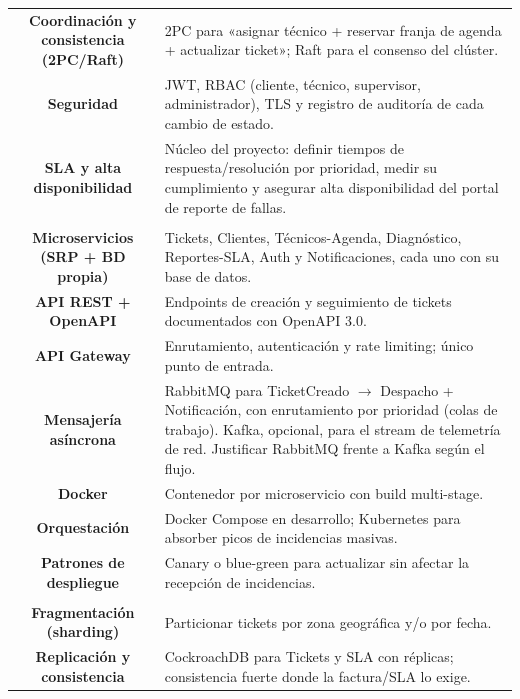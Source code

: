 \documentclass[11pt]{article}
\begin{document}
\begin{longtable}{C A}
\textbf{Coordinación y consistencia (2PC/Raft)} & 2PC para «asignar técnico + reservar franja de agenda + actualizar ticket»; Raft para el consenso del clúster.\\
\textbf{Seguridad} & JWT, RBAC (cliente, técnico, supervisor, administrador), TLS y registro de auditoría de cada cambio de estado.\\
\textbf{SLA y alta disponibilidad} & Núcleo del proyecto: definir tiempos de respuesta/resolución por prioridad, medir su cumplimiento y asegurar alta disponibilidad del portal de reporte de fallas.\\
\addlinespace[1pt]
\\
\textbf{Microservicios (SRP + BD propia)} & Tickets, Clientes, Técnicos-Agenda, Diagnóstico, Reportes-SLA, Auth y Notificaciones, cada uno con su base de datos.\\
\textbf{API REST + OpenAPI} & Endpoints de creación y seguimiento de tickets documentados con OpenAPI 3.0.\\
\textbf{API Gateway} & Enrutamiento, autenticación y rate limiting; único punto de entrada.\\
\textbf{Mensajería asíncrona} & RabbitMQ para TicketCreado $\rightarrow$ Despacho + Notificación, con enrutamiento por prioridad (colas de trabajo). Kafka, opcional, para el stream de telemetría de red. Justificar RabbitMQ frente a Kafka según el flujo.\\
\textbf{Docker} & Contenedor por microservicio con build multi-stage.\\
\textbf{Orquestación} & Docker Compose en desarrollo; Kubernetes para absorber picos de incidencias masivas.\\
\textbf{Patrones de despliegue} & Canary o blue-green para actualizar sin afectar la recepción de incidencias.\\
\addlinespace[1pt]
\\
\textbf{Fragmentación (sharding)} & Particionar tickets por zona geográfica y/o por fecha.\\
\textbf{Replicación y consistencia} & CockroachDB para Tickets y SLA con réplicas; consistencia fuerte donde la factura/SLA lo exige.\\

\end{longtable}
\end{document}
